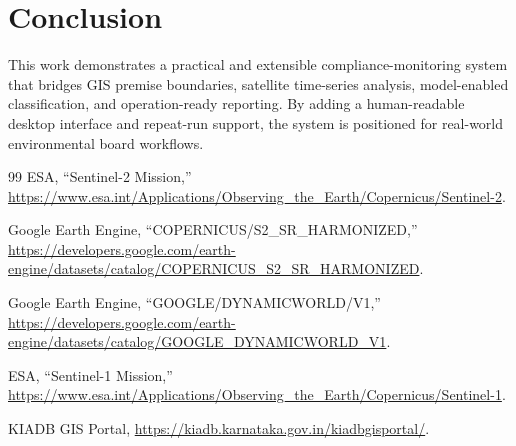 \documentclass[conference]{IEEEtran}
\begin{document}
\section{Conclusion}
This work demonstrates a practical and extensible compliance-monitoring system that bridges GIS premise boundaries, satellite time-series analysis, model-enabled classification, and operation-ready reporting. By adding a human-readable desktop interface and repeat-run support, the system is positioned for real-world environmental board workflows.

\begin{thebibliography}{99}
ESA, ``Sentinel-2 Mission,'' \url{https://www.esa.int/Applications/Observing_the_Earth/Copernicus/Sentinel-2}.

Google Earth Engine, ``COPERNICUS/S2\_SR\_HARMONIZED,'' \url{https://developers.google.com/earth-engine/datasets/catalog/COPERNICUS_S2_SR_HARMONIZED}.

Google Earth Engine, ``GOOGLE/DYNAMICWORLD/V1,'' \url{https://developers.google.com/earth-engine/datasets/catalog/GOOGLE_DYNAMICWORLD_V1}.

ESA, ``Sentinel-1 Mission,'' \url{https://www.esa.int/Applications/Observing_the_Earth/Copernicus/Sentinel-1}.

KIADB GIS Portal, \url{https://kiadb.karnataka.gov.in/kiadbgisportal/}.
\end{thebibliography}
\end{document}
